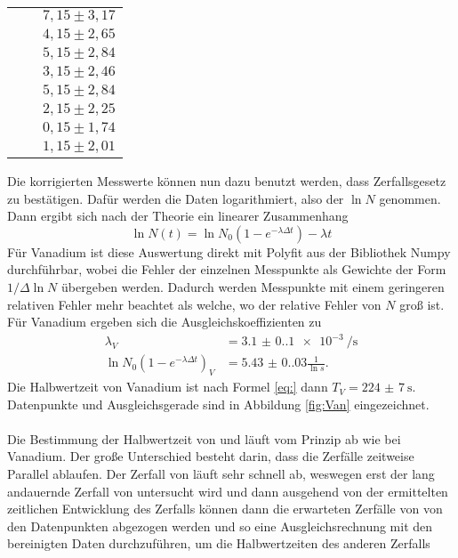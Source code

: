 \begin{table}[H]
\begin{tabular}{c c c}
      &  & $7,15 \pm 3,17$ \\
      &  & $4,15 \pm 2,65$ \\
      &  & $5,15 \pm 2,84$ \\
      &  & $3,15 \pm 2,46$ \\
      &  & $5,15 \pm 2,84$ \\
      &  & $2,15 \pm 2,25$ \\
      &  & $0,15 \pm 1,74$ \\
      &  & $1,15 \pm 2,01$ \\
      \bottomrule
  \end{tabular}
\end{table}

\noindent Die korrigierten Messwerte können nun dazu benutzt werden, dass Zerfallsgesetz zu bestätigen.
Dafür werden die Daten logarithmiert, also der $\ln{N}$ genommen. Dann ergibt sich
nach der Theorie ein linearer Zusammenhang
\begin{equation}
    \ln{N(t)}=\ln{N_0(1-e^{-\lambda \Delta t})}-\lambda t
    \label{eq:linN}
\end{equation}
Für Vanadium ist diese Auswertung direkt mit Polyfit aus der Bibliothek Numpy \cite{numpy}
durchführbar, wobei die Fehler der einzelnen Messpunkte als Gewichte der Form $1/\Delta \ln{N}$ übergeben werden. Dadurch werden 
Messpunkte mit einem geringeren relativen Fehler mehr beachtet als welche, wo der relative Fehler von $N$ groß ist.
Für Vanadium ergeben sich die Ausgleichskoeffizienten zu
\begin{align*}
  \lambda_V&=\qty{3.1(0.1)e-3}{\per\s}\\
  \ln{N_0(1-e^{-\lambda \Delta t})}_V&=\num{5.43(0.03)}\frac{1}{\ln{s}}.
\end{align*}
Die Halbwertzeit von Vanadium ist nach Formel \eqref{eq:} dann $T_V=\qty{224(7)}{\second}$.
Datenpunkte und Ausgleichsgerade sind in Abbildung \ref{fig:Van} eingezeichnet.\\
\\
\noindent Die Bestimmung der Halbwertzeit von  und  läuft vom Prinzip
ab wie bei Vanadium. Der große Unterschied besteht darin, dass die Zerfälle zeitweise Parallel ablaufen.
Der Zerfall von  läuft sehr schnell ab, weswegen erst der lang andauernde Zerfall von 
untersucht wird und dann ausgehend von der ermittelten zeitlichen Entwicklung
des Zerfalls können dann die erwarteten Zerfälle von  von den Datenpunkten
abgezogen werden und so eine Ausgleichsrechnung mit den bereinigten Daten durchzuführen, um die Halbwertzeiten des anderen Zerfalls 

